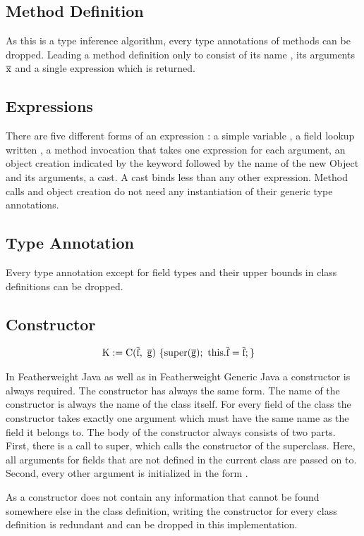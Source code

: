 \subsection{Method Definition}

As this is a type inference algorithm, every type annotations of methods can be dropped. Leading a method definition only to consist of its name , its arguments $\overline{\text{x}}$ and a single expression  which is returned.

\subsection{Expressions}

There are five different forms of an expression : a simple variable , a field lookup written , a method invocation that takes one expression for each argument, an object creation indicated by the keyword  followed by the name of the new Object and its arguments, a cast.
A cast binds less than any other expression. Method calls and object creation do not need any instantiation of their generic type annotations.

\subsection{Type Annotation}

Every type annotation except for field types and their upper bounds in class definitions can be dropped.

\subsection{Constructor}

\begin{align*}
    \text{K} &:= \text{C}(\overline{\text{f}}, \ \overline{\text{g}}) \ \{ \text{super}(\overline{\text{g}}); \ \text{this}.\overline{\text{f}}=\overline{\text{f}}; \}
\end{align*}

In Featherweight Java as well as in Featherweight Generic Java a constructor is always required. The constructor has always the same form.
The name of the constructor is always the name of the class itself. For every field of the class the constructor takes exactly one argument which must have the same name as the field it belongs to.
The body of the constructor always consists of two parts. First, there is a call to super, which calls the constructor of the superclass. Here, all arguments for fields that are not defined in the current class are passed on to.
Second, every other argument is initialized in the form .

As a constructor does not contain any information that cannot be found somewhere else in the class definition, writing the constructor for every class definition is redundant and can be dropped in this implementation.
